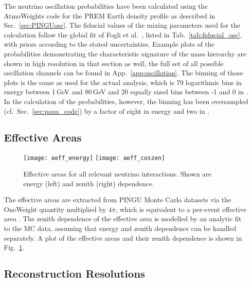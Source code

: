 The neutrino oscillation probabilities have been calculated using the
AtmoWeights code for the PREM Earth density profile as described in
Sec.~\ref{sec:PINGUosc}. The fiducial values of the mixing parameters used for
the calculation follow the global fit of Fogli et al.\ \cite{Fogli}, listed in
Tab.~\ref{tab:fiducial_osc}, with priors according to the stated uncertainties.
Example plots of the probabilities demonstrating
the characteristic signature of the mass hierarchy are shown in high resolution
in that section as well, the full set of all possible oscillation channels can
be found in App.~\ref{app:oscillation}. The binning of those plots is the same
as used for the actual analysis, which is 79 logarithmic bins in energy between
1\,GeV and 80\,GeV and 20 equally sized bins between -1 and 0 in \coszen. In
the calculation of the probabilities, however, the binning has been oversampled
(cf.\ Sec.~\ref{sec:papa_code}) by a factor of eight in energy and two in
\coszen.

\subsection{Effective Areas}
\label{sec:input_aeff}

\begin{figure}[htbp]
 \centering
 \texttt{[image: aeff\_energy]}
 \texttt{[image: aeff\_coszen]}
 \caption{Effective areas for all relevant neutrino interactions. Shown are
  energy (left)  and zenith (right) dependence.}
\label{fig:aeffs}
\end{figure}

\noindent
The effective areas are extracted from PINGU Monte Carlo datasets via the
OneWeight quantity multiplied by $4\pi$, which is equivalent to a per-event
effective area \cite{OneWeight}. The zenith dependence of the effective area is
modelled by an analytic fit to the MC data, assuming that energy and zenith
dependence can be handled separately. A plot of the effective areas and their
zenith dependence is shown in Fig.~\ref{fig:aeffs}.

\subsection{Reconstruction Resolutions}
\label{sec:input_reco}


